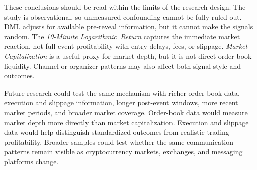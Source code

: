 These conclusions should be read within the limits of the research design. The study is observational, so unmeasured confounding cannot be fully ruled out. DML adjusts for available pre-reveal information, but it cannot make the signals random. The \textit{10-Minute Logarithmic~Return} captures the immediate market reaction, not full event profitability with entry delays, fees, or slippage. \textit{Market Capitalization} is a useful proxy for market depth, but it is not direct order-book liquidity. Channel or organizer patterns may also affect both signal style and outcomes.

Future research could test the same mechanism with richer order-book data, execution and slippage information, longer post-event windows, more recent market periods, and broader market coverage. Order-book data would measure market depth more directly than market capitalization. Execution and slippage data would help distinguish standardized outcomes from realistic trading profitability. Broader samples could test whether the same communication patterns remain visible as cryptocurrency markets, exchanges, and messaging platforms change.

